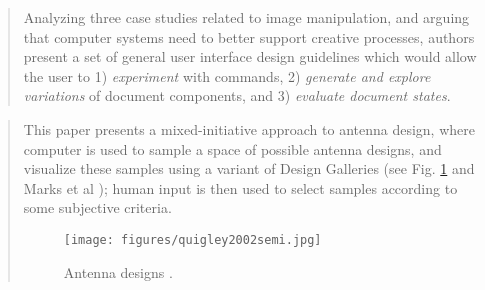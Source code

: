 

		\begin{quote}
		\small
		Analyzing three case studies related to image manipulation, 
		and arguing that computer systems need to better support creative processes, 
		authors present a set of general user interface design guidelines which would allow the user to 
		1) \emph{experiment} with commands, 
		2) \emph{generate and explore variations} of document components, and
		3) \emph{evaluate document states}.
		\end{quote}

		\begin{quote}
		\small
		This paper presents a mixed-initiative
		approach to antenna design, where computer is used to sample a space of possible antenna designs, and 
		visualize these samples using a variant of Design Galleries (see Fig. \ref{fig:quigley2002semi}
		and Marks et al \cite{marks1997design}); 
		human input is then used to select samples according to some subjective criteria.
		\begin{figure}[htb]
		\begin{center}
		\texttt{[image: figures/quigley2002semi.jpg]}
		\caption{Antenna designs \cite{quigley2002semi}.}
		\label{fig:quigley2002semi}
		\end{center}
		\end{figure}
		\end{quote}
		

